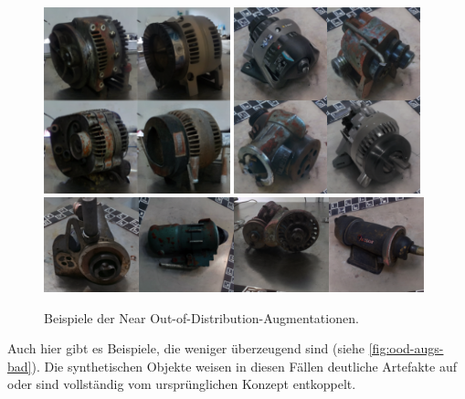 \begin{figure}
	\centering
	\includegraphics[width=0.48\textwidth]{figure_results_ood-augs_good_1.png}%
	\hspace{0.02\textwidth}\includegraphics[width=0.48\textwidth]{figure_results_ood-augs_good_3.png}\vspace{0.01\textwidth}
	\includegraphics[width=0.98\textwidth]{figure_results_ood-augs_good_4.png}
	\caption{Beispiele der Near Out-of-Distribution-Augmentationen.}
	\label{fig:ood-augs-good}
\end{figure}

Auch hier gibt es Beispiele, die weniger überzeugend sind (siehe \autoref{fig:ood-augs-bad}). Die synthetischen Objekte weisen in diesen Fällen deutliche Artefakte auf oder sind vollständig vom ursprünglichen Konzept entkoppelt.

